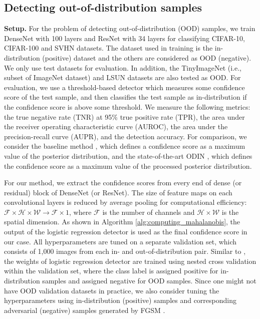 \documentclass{article}
\begin{document}
\subsection{Detecting out-of-distribution samples}

{\bf Setup.} For the problem of detecting out-of-distribution (OOD) samples,
we train DenseNet with 100 layers and ResNet with 34 layers for classifying CIFAR-10, CIFAR-100 and SVHN datasets.
The dataset used in training is the in-distribution (positive) dataset and the others are considered as OOD (negative).
We only use test datasets for evaluation.
In addition, 
the TinyImageNet (i.e., subset of ImageNet dataset) and LSUN datasets are also tested as OOD.
For evaluation, 
we use a threshold-based detector which measures some confidence score of the test sample, and then classifies the test sample as in-distribution if the confidence score is above some threshold.
We measure the following metrics:
the true negative rate (TNR) at 95\% true positive rate (TPR),
the area under the receiver operating characteristic curve (AUROC),
the area under the precision-recall curve (AUPR), and
the detection accuracy.
For comparison, we consider the baseline method \citep{hendrycks2016baseline}, 
which defines a confidence score as a maximum value of the posterior distribution, and the state-of-the-art ODIN \citep{liang2017principled}, which defines the confidence score as a maximum value of the processed posterior distribution.



For our method, we extract the confidence scores from every end of dense (or residual) block of DenseNet (or ResNet).
The size of feature maps on each convolutional layers is reduced by average pooling for computational efficiency: $\mathcal{F} \times \mathcal{H} \times \mathcal{W} \rightarrow \mathcal{F} \times 1$, where $\mathcal{F}$ is the number of channels and $\mathcal{H} \times \mathcal{W}$ is the spatial dimension.
As shown in Algorithm \ref{alg:computing_mahalanobis}, 
the output of the logistic regression detector is used as the final confidence score in our case.
All hyperparameters are tuned on a separate validation set, which consists of 1,000 images from each in- and out-of-distribution pair.
Similar to \citet{ma2018characterizing}, the weights of logistic regression detector are trained using nested cross validation within the validation set, where the class label is assigned positive for in-distribution samples and assigned negative for OOD samples.
Since one might not have OOD validation datasets in practice,
we also consider tuning the hyperparameters using in-distribution (positive) samples and corresponding adversarial (negative) samples generated by FGSM \citep{goodfellow2014explaining}.
\end{document}
